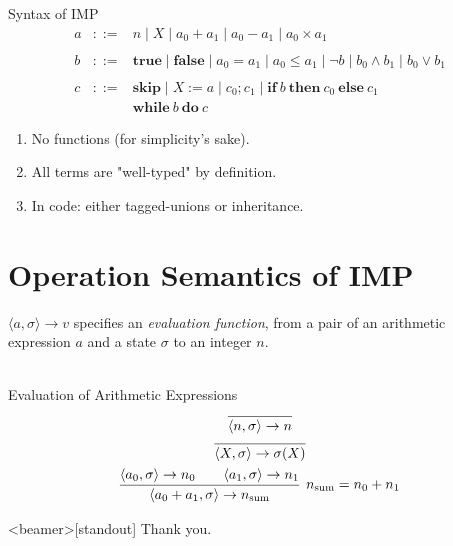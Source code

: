 \begin{frame}
    \begin{block}{Syntax of IMP}
    \[\begin{array}{rcl}
        a & ::= & n
                \mid X
                \mid a_0 + a_1
                \mid a_0 - a_1
                \mid a_0 \times a_1 \\
                \\
        b & ::= & \mathbf{true}
                \mid \mathbf{false}
                \mid a_0 = a_1
                \mid a_0 \leq a_1
                \mid ¬b
                \mid b_0 \wedge b_1
                \mid b_0 \vee b_1 \\
                \\
        c & ::= & \mathbf{skip}
                \mid X := a
                \mid c_0; c_1
                \mid \mathbf{if}\ b\ \mathbf{then}\ c_0\ \mathbf{else}\ c_1 \\
                && \mathbf{while}\ b\ \mathbf{do}\ c
    \end{array} \]
    \end{block}%
    \pause
    \begin{enumerate}
        \item No functions (for simplicity's sake).
        \item All terms are "well-typed" by definition.
        \item In code: either tagged-unions or inheritance.
    \end{enumerate}
\end{frame}

\section{Operation Semantics of IMP}

\begin{frame}
    $\langle a, \sigma \rangle \rightarrow v$ specifies an \emph{evaluation function}, from
    a pair of an arithmetic expression $a$ and a state $\sigma$ to an integer $n$.\\
    \\
    \pause
    \begin{block}{Evaluation of Arithmetic Expressions}
        \begin{gather*}
            \infer{\langle n , \sigma \rangle \rightarrow n}{} \\
            \infer{\langle X , \sigma \rangle \rightarrow \sigma(X)}{} \\
            \infer[n_\mathrm{sum} = n_0 + n_1]{\langle a_0 + a_1 , \sigma \rangle \rightarrow n_\mathrm{sum}}{\langle a_0 , \sigma \rangle \rightarrow n_0 \qquad \langle a_1 , \sigma \rangle \rightarrow n_1}
        \end{gather*}
    \end{block}%
\end{frame}

\begin{frame}<beamer>[standout]
  Thank you.
\end{frame}





